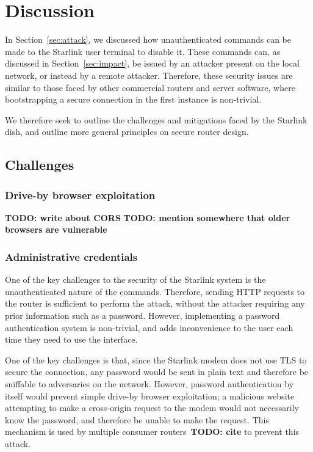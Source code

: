 \section{Discussion}\label{sec:discussion}

In Section~\ref{sec:attack}, we discussed how unauthenticated commands can be made to the Starlink user terminal to disable it.
These commands can, as discussed in Section~\ref{sec:impact}, be issued by an attacker present on the local network, or instead by a remote attacker.
Therefore, these security issues are similar to those faced by other commercial routers and server software, where bootstrapping a secure connection in the first instance is non-trivial.

We therefore seek to outline the challenges and mitigations faced by the Starlink dish, and outline more general principles on secure router design.

\subsection{Challenges}

\subsubsection{Drive-by browser exploitation}

\textbf{TODO: write about CORS}
\textbf{TODO: mention somewhere that older browsers are vulnerable}

\subsubsection{Administrative credentials}

One of the key challenges to the security of the Starlink system is the unauthenticated nature of the commands.
Therefore, sending HTTP requests to the router is sufficient to perform the attack, without the attacker requiring any prior information such as a password.
However, implementing a password authentication system is non-trivial, and adds inconvenience to the user each time they need to use the interface.

One of the key challenges is that, since the Starlink modem does not use TLS to secure the connection, any password would be sent in plain text and therefore be sniffable to adversaries on the network.
However, password authentication by itself would prevent simple drive-by browser exploitation; a malicious website attempting to make a cross-origin request to the modem would not necessarily know the password, and therefore be unable to make the request.
This mechanism is used by multiple consumer routers~\textbf{TODO: cite} to prevent this attack.


